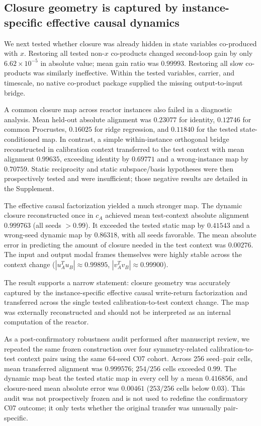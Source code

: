 \documentclass[aps,pre,preprint,superscriptaddress,nofootinbib]{revtex4-2}
\begin{document}
\subsection{Closure geometry is captured by instance-specific effective causal dynamics}

We next tested whether closure was already hidden in state variables co-produced with $x$. Restoring all tested non-$x$ co-products changed second-loop gain by only $6.62\times10^{-5}$ in absolute value; mean gain ratio was $0.99993$. Restoring all slow co-products was similarly ineffective. Within the tested variables, carrier, and timescale, no native co-product package supplied the missing output-to-input bridge.

A common closure map across reactor instances also failed in a diagnostic analysis. Mean held-out absolute alignment was $0.23077$ for identity, $0.12746$ for common Procrustes, $0.16025$ for ridge regression, and $0.11840$ for the tested state-conditioned map. In contrast, a simple within-instance orthogonal bridge reconstructed in calibration context transferred to the test context with mean alignment $0.99635$, exceeding identity by $0.69771$ and a wrong-instance map by $0.70759$. Static reciprocity and static subspace/basis hypotheses were then prospectively tested and were insufficient; those negative results are detailed in the Supplement.

The effective causal factorization yielded a much stronger map. The dynamic closure reconstructed once in $c_A$ achieved mean test-context absolute alignment $0.999763$ (all seeds $>0.99$). It exceeded the tested static map by $0.41543$ and a wrong-seed dynamic map by $0.86318$, with all seeds favorable. The mean absolute error in predicting the amount of closure needed in the test context was $0.00276$. The input and output modal frames themselves were highly stable across the context change ($|u_A^Tu_B|\approx0.99895$, $|v_A^Tv_B|\approx0.99900$).

The result supports a narrow statement: closure geometry was accurately captured by the instance-specific effective causal write-return factorization and transferred across the single tested calibration-to-test context change. The map was externally reconstructed and should not be interpreted as an internal computation of the reactor.

As a post-confirmatory robustness audit performed after manuscript review, we repeated the same frozen construction over four symmetry-related calibration-to-test context pairs using the same 64-seed C07 cohort. Across 256 seed--pair cells, mean transferred alignment was $0.999576$; $254/256$ cells exceeded $0.99$. The dynamic map beat the tested static map in every cell by a mean $0.416856$, and closure-need mean absolute error was $0.00461$ ($253/256$ cells below $0.03$). This audit was not prospectively frozen and is not used to redefine the confirmatory C07 outcome; it only tests whether the original transfer was unusually pair-specific.
\end{document}

